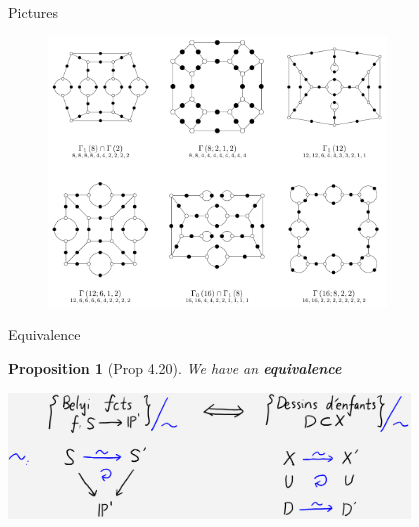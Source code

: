 \documentclass[pdf]{beamer}
\numberwithin{equation}{section}
\theoremstyle{plain}
\newtheorem{proposition}[theorem]{Proposition}
\theoremstyle{plain}
\theoremstyle{remark}
\begin{document}
\begin{frame}[fragile]{Pictures}
\begin{figure}[th]
	\begin{minipage}[b]{\textwidth}
		\centering
		\includegraphics[width=0.8\textwidth]{figures/dessingrand.png}
	\end{minipage}
\end{figure}
\end{frame}
\begin{frame}{Equivalence}
	\begin{proposition}[Prop 4.20]
		We have an \textbf{equivalence}
		\begin{center}
		\includegraphics[width=0.8\textwidth]{figures/equivalence.png}
		\end{center}
	\end{proposition}
\end{frame}
\end{document}
